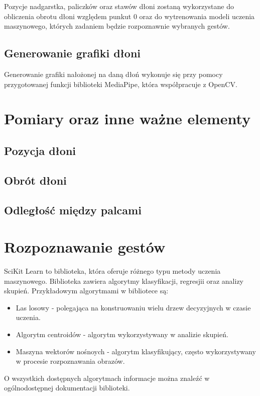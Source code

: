     \quad Pozycje nadgarstka, paliczków oraz stawów dłoni zostaną wykorzystane do obliczenia obrotu dłoni względem punkut 0 oraz do wytrenowania modeli uczenia maszynowego, których zadaniem będzie rozpoznawnie wybranych gestów. 
    
    \subsection{Generowanie grafiki dłoni}
    
    \quad Generowanie grafiki nałożonej na daną dłoń wykonuje się przy pomocy przygotowanej funkcji biblioteki MediaPipe, która współpracuje z OpenCV.   

    \section{Pomiary oraz inne ważne elementy}

    \subsection{Pozycja dłoni}

    \subsection{Obrót dłoni}

    \subsection{Odległość między palcami}
    
    
    

    \section{Rozpoznawanie gestów}
    
    \quad SciKit Learn to biblioteka, która oferuje różnego typu metody uczenia maszynowego. Biblioteka zawiera algorytmy klasyfikacji, regresjii oraz analizy skupień. Przykładowym algorytmami w bibliotece są:
    \begin{itemize}
        \item Las losowy - polegająca na konstruowaniu wielu drzew decyzyjnych w czasie uczenia. 
        \item Algorytm centroidów - algorytm wykorzystywany w analizie skupień.
        \item Maszyna wektorów nośnoych - algorytm klasyfikujący, często wykorzystywany w procesie rozpoznawania obrazów. 
    \end{itemize}
    O wszystkich dostępnych algorytmach informacje można znaleźć w ogólnodostępnej dokumentacji biblioteki. 
    
